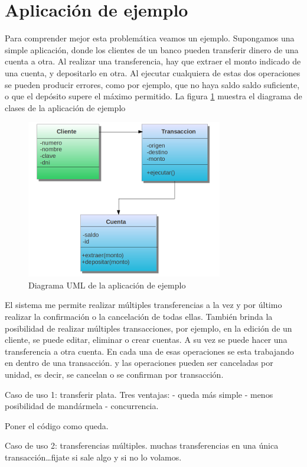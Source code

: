 \section{Aplicación de ejemplo}

Para comprender mejor esta problemática veamos un ejemplo. Supongamos una simple
aplicación, donde los clientes de un banco pueden transferir dinero de
una cuenta a otra. Al realizar una transferencia, hay que extraer el monto
indicado de una cuenta, y depositarlo en otra. 
Al ejecutar cualquiera de estas dos operaciones se pueden producir errores,
como por ejemplo, que no haya saldo saldo suficiente, o que el depósito supere
el máximo permitido.
La  figura \ref{example} muestra el diagrama de clases de la aplicación de
ejemplo

	\begin{figure}[h]
		\includegraphics{img/objectTransaction}
		\caption{Diagrama UML de la aplicación de ejemplo}
		\label{example}
	\end{figure}	


El sistema me permite realizar múltiples transferencias a la vez y por último
realizar la confirmación o la cancelación de todas ellas. También brinda la posibilidad
de realizar múltiples transacciones, por ejemplo, en la edición de un cliente,
se puede editar, eliminar o crear cuentas. A su vez se puede hacer una
transferencia a otra cuenta. En cada una de esas operaciones se esta
trabajando en dentro de una transacción. y las operaciones pueden ser
canceladas por unidad, es decir, se cancelan o se confirman por transacción.

Caso de uso 1: transferir plata.
Tres ventajas:
- queda más simple
- menos posibilidad de mandármela
- concurrencia.

Poner el código como queda.

Caso de uso 2: transferencias múltiples.
muchas transferencias en una única transacción\ldots fijate si sale algo y si no
lo volamos.

